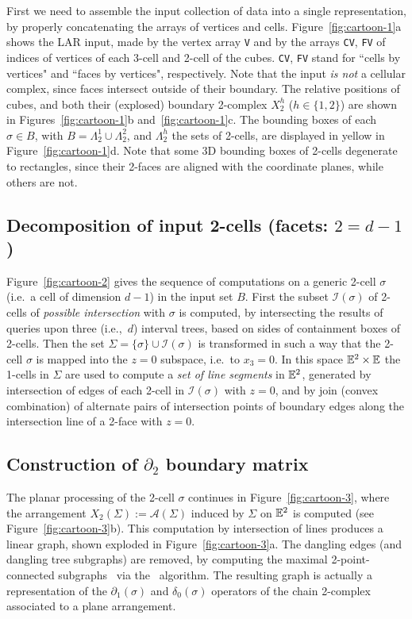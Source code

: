 First we need to assemble the input collection of data into a single representation, by properly concatenating the arrays of vertices and cells.
Figure~\ref{fig:cartoon-1}a shows the LAR input, made by the vertex array \texttt{V} and by the arrays \texttt{CV}, \texttt{FV} of indices of vertices of each 3-cell and 2-cell of the cubes. \texttt{CV}, \texttt{FV} stand for ``cells by vertices" and ``faces by vertices", respectively. Note that the input \emph{is not} a cellular complex, since faces intersect outside of their boundary.  The relative positions of cubes, and {both their (explosed) boundary 2-complex $X^h_2$ ($h\in \{1,2\}$)} are shown in Figures~\ref{fig:cartoon-1}b and~\ref{fig:cartoon-1}c.  
The bounding boxes of each $\sigma\in B$, with $B=\Lambda_2^1 \cup \Lambda_2^2$, and $\Lambda_2^h$ the sets of 2-cells, are displayed in yellow in Figure~\ref{fig:cartoon-1}d. Note that some 3D bounding boxes of 2-cells degenerate to rectangles, since their 2-faces are aligned with the coordinate planes, while others are not.

\subsection{Decomposition of input 2-cells  (facets: $2=d-1$)}
Figure~\ref{fig:cartoon-2} gives the sequence of computations on a generic 2-cell $\sigma$ (i.e.~a cell of dimension $d-1$) in the input set $B$. First the subset $\mathcal{I}(\sigma)$ of 2-cells of \emph{possible intersection} with $\sigma$ is computed, by intersecting the results of queries upon three (i.e.,~$d$) interval trees, based on sides of containment boxes of 2-cells. Then the set $\Sigma = \{\sigma\}\cup\mathcal{I}(\sigma)$ is transformed in such a way that the 2-cell $\sigma$ is mapped into the $z=0$ subspace, i.e.~to $x_3=0$.  
In this space $\mathbb{E}^2\times\mathbb{E}$ the 1-cells in $\Sigma$ are used to compute a \emph{set of line segments} in $\mathbb{E}^2$, generated by intersection of edges of each 2-cell in $\mathcal{I}(\sigma)$ with $z=0$, and by join (convex combination) of alternate pairs of intersection points of boundary edges along the intersection line of a 2-face with $z=0$. 

\subsection{Construction of $\partial_2$ boundary matrix}

The {planar processing of the 2-cell $\sigma$} continues in Figure~\ref{fig:cartoon-3}, where the  arrangement {$X_2(\Sigma) := \mathcal{A}(\Sigma)$} induced by $\Sigma$ on $\mathbb{E}^2$ is computed (see Figure~\ref{fig:cartoon-3}b). This computation by intersection of lines produces a linear graph, shown exploded in Figure~\ref{fig:cartoon-3}a. The dangling edges (and  dangling tree subgraphs) are removed, by computing the maximal 2-point-connected subgraphs~\cite{vialar2016handbook} via the~\cite{Hopcroft:1973:AEA:362248.362272} algorithm.  The resulting graph is actually a representation of the $\partial_1(\sigma)$ and $\delta_0(\sigma)$ operators of the chain 2-complex associated to a plane arrangement.



